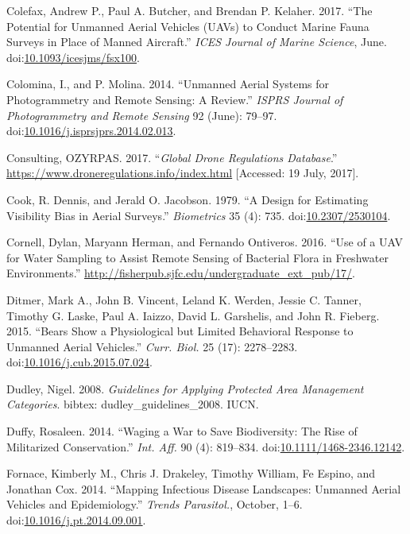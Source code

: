 \documentclass[]{interact}
\theoremstyle{plain}%
\theoremstyle{definition}
\theoremstyle{remark}
\begin{document}
\hypertarget{ref-colefax_potential_2017}{}
Colefax, Andrew P., Paul A. Butcher, and Brendan P. Kelaher. 2017. ``The
Potential for Unmanned Aerial Vehicles (UAVs) to Conduct Marine Fauna
Surveys in Place of Manned Aircraft.'' \emph{ICES Journal of Marine
Science}, June.
doi:\href{https://doi.org/10.1093/icesjms/fsx100}{10.1093/icesjms/fsx100}.

\hypertarget{ref-colomina_unmanned_2014}{}
Colomina, I., and P. Molina. 2014. ``Unmanned Aerial Systems for
Photogrammetry and Remote Sensing: A Review.'' \emph{ISPRS Journal of
Photogrammetry and Remote Sensing} 92 (June): 79--97.
doi:\href{https://doi.org/10.1016/j.isprsjprs.2014.02.013}{10.1016/j.isprsjprs.2014.02.013}.

\hypertarget{ref-Global2017}{}
Consulting, OZYRPAS. 2017. ``\emph{Global Drone Regulations Database}.''
\url{https://www.droneregulations.info/index.html} {[}Accessed: 19 July,
2017{]}.

\hypertarget{ref-cook_design_1979}{}
Cook, R. Dennis, and Jerald O. Jacobson. 1979. ``A Design for Estimating
Visibility Bias in Aerial Surveys.'' \emph{Biometrics} 35 (4): 735.
doi:\href{https://doi.org/10.2307/2530104}{10.2307/2530104}.

\hypertarget{ref-cornell_use_2016}{}
Cornell, Dylan, Maryann Herman, and Fernando Ontiveros. 2016. ``Use of a
UAV for Water Sampling to Assist Remote Sensing of Bacterial Flora in
Freshwater Environments.''
\url{http://fisherpub.sjfc.edu/undergraduate_ext_pub/17/}.

\hypertarget{ref-ditmer_bears_2015}{}
Ditmer, Mark A., John B. Vincent, Leland K. Werden, Jessie C. Tanner,
Timothy G. Laske, Paul A. Iaizzo, David L. Garshelis, and John R.
Fieberg. 2015. ``Bears Show a Physiological but Limited Behavioral
Response to Unmanned Aerial Vehicles.'' \emph{Curr. Biol.} 25 (17):
2278--2283.
doi:\href{https://doi.org/10.1016/j.cub.2015.07.024}{10.1016/j.cub.2015.07.024}.

\hypertarget{ref-dudley_guidelines_2008}{}
Dudley, Nigel. 2008. \emph{Guidelines for Applying Protected Area
Management Categories}. bibtex: dudley\_guidelines\_2008. IUCN.

\hypertarget{ref-duffy_waging_2014}{}
Duffy, Rosaleen. 2014. ``Waging a War to Save Biodiversity: The Rise of
Militarized Conservation.'' \emph{Int. Aff.} 90 (4): 819--834.
doi:\href{https://doi.org/10.1111/1468-2346.12142}{10.1111/1468-2346.12142}.

\hypertarget{ref-fornace_mapping_2014}{}
Fornace, Kimberly M., Chris J. Drakeley, Timothy William, Fe Espino, and
Jonathan Cox. 2014. ``Mapping Infectious Disease Landscapes: Unmanned
Aerial Vehicles and Epidemiology.'' \emph{Trends Parasitol.}, October,
1--6.
doi:\href{https://doi.org/10.1016/j.pt.2014.09.001}{10.1016/j.pt.2014.09.001}.
\end{document}
